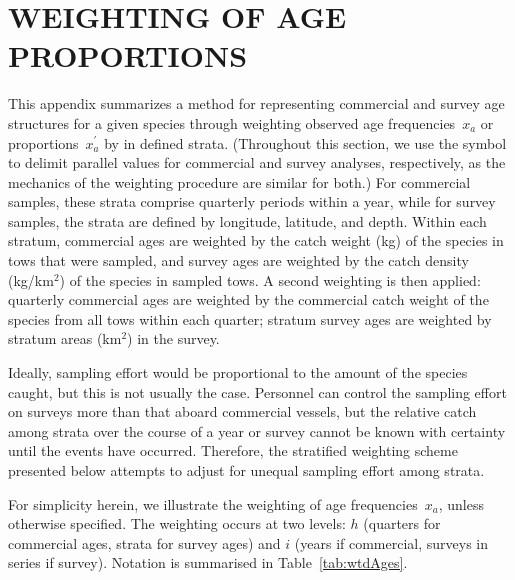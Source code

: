 \clearpage

\chapter{WEIGHTING OF AGE PROPORTIONS}

This appendix summarizes a method for representing commercial and survey age structures for a given species through weighting observed age frequencies~$x_a$ or proportions~$x^\prime_a$ by  in defined strata. 
(Throughout this section, we use the symbol \sQuote{$\Vert$} to delimit parallel values for commercial and survey analyses, respectively, as the mechanics of the weighting procedure are similar for both.) 
For commercial samples, these strata comprise quarterly periods within a year, while for survey samples, the strata are defined by longitude, latitude, and depth. 
Within each stratum, commercial ages are weighted by the catch weight (kg) of the species in tows that were sampled, and survey ages are weighted by the catch density (kg/km$^2$) of the species in sampled tows. 
A second weighting is then applied: quarterly commercial ages are weighted by the commercial catch weight of the species from all tows within each quarter; stratum survey ages are weighted by stratum areas (km$^2$) in the survey. 

Ideally, sampling effort would be proportional to the amount of the species caught, but this is not usually the case. 
Personnel can control the sampling effort on surveys more than that aboard commercial vessels, but the relative catch among strata over the course of a year or survey cannot be known with certainty until the events have occurred. 
Therefore, the stratified weighting scheme presented below attempts to adjust for unequal sampling effort among strata.

For simplicity herein, we illustrate the weighting of age frequencies~$x_a$, unless otherwise specified. 
The weighting occurs at two levels: $h$ (quarters for commercial ages, strata for survey ages) and $i$ (years if commercial, surveys in series if survey). 
Notation is summarised in Table~\ref{tab:wtdAges}.

